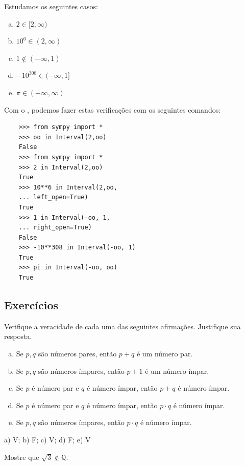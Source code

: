 \begin{ex}
  Estudamos os seguintes casos:
  \begin{enumerate}[a)]
  \item $2\in [2, \infty)$
  \item $10^6\in (2, \infty)$
  \item $1 \not\in (-\infty, 1)$
  \item $-10^{308} \in (-\infty, 1]$
  \item $\pi \in (-\infty, \infty)$
  \end{enumerate}
  \ifispython
  Com o \python, podemos fazer estas verificações com os seguintes comandos:
  \begin{lstlisting}
    >>> from sympy import *
    >>> oo in Interval(2,oo)
    False
    >>> from sympy import *
    >>> 2 in Interval(2,oo)
    True
    >>> 10**6 in Interval(2,oo,
    ... left_open=True)
    True
    >>> 1 in Interval(-oo, 1,
    ... right_open=True)
    False
    >>> -10**308 in Interval(-oo, 1)
    True
    >>> pi in Interval(-oo, oo)
    True
  \end{lstlisting}
  \fi
\end{ex}

\subsection*{Exercícios}

\begin{exer}
  Verifique a veracidade de cada uma das seguintes afirmações. Justifique sua resposta.
  \begin{enumerate}[a)]
  \item Se $p,q$ são números pares, então $p+q$ é um número par.
  \item Se $p,q$ são números ímpares, então $p+1$ é um número ímpar.
  \item Se $p$ é número par e $q$ é número ímpar, então $p+q$ é número ímpar.
  \item Se $p$ é número par e $q$ é número ímpar, então $p\cdot q$ é número ímpar.
  \item Se $p,q$ são números ímpares, então $p\cdot q$ é número ímpar.
  \end{enumerate}
\end{exer}
\begin{resp}
  a) V; b) F; c) V; d) F; e) V
\end{resp}

\begin{exer}
  Mostre que $\sqrt{3}\not\in\mathbb{Q}$.
\end{exer}

